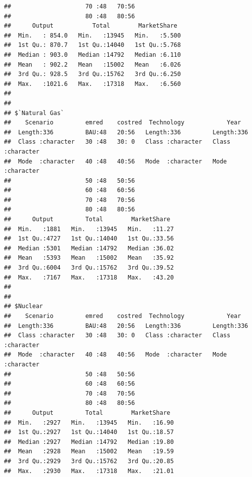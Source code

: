 \documentclass[]{article}
\begin{document}
\begin{verbatim}
##                     70 :48   70:56                                        
##                     80 :48   80:56                                        
##      Output           Total        MarketShare   
##  Min.   : 854.0   Min.   :13945   Min.   :5.500  
##  1st Qu.: 870.7   1st Qu.:14040   1st Qu.:5.768  
##  Median : 903.0   Median :14792   Median :6.110  
##  Mean   : 902.2   Mean   :15002   Mean   :6.026  
##  3rd Qu.: 928.5   3rd Qu.:15762   3rd Qu.:6.250  
##  Max.   :1021.6   Max.   :17318   Max.   :6.560  
##                                                  
## 
## $`Natural Gas`
##    Scenario         emred    costred  Technology            Year          
##  Length:336         BAU:48   20:56   Length:336         Length:336        
##  Class :character   30 :48   30: 0   Class :character   Class :character  
##  Mode  :character   40 :48   40:56   Mode  :character   Mode  :character  
##                     50 :48   50:56                                        
##                     60 :48   60:56                                        
##                     70 :48   70:56                                        
##                     80 :48   80:56                                        
##      Output         Total        MarketShare   
##  Min.   :1881   Min.   :13945   Min.   :11.27  
##  1st Qu.:4727   1st Qu.:14040   1st Qu.:33.56  
##  Median :5301   Median :14792   Median :36.02  
##  Mean   :5393   Mean   :15002   Mean   :35.92  
##  3rd Qu.:6004   3rd Qu.:15762   3rd Qu.:39.52  
##  Max.   :7167   Max.   :17318   Max.   :43.20  
##                                                
## 
## $Nuclear
##    Scenario         emred    costred  Technology            Year          
##  Length:336         BAU:48   20:56   Length:336         Length:336        
##  Class :character   30 :48   30: 0   Class :character   Class :character  
##  Mode  :character   40 :48   40:56   Mode  :character   Mode  :character  
##                     50 :48   50:56                                        
##                     60 :48   60:56                                        
##                     70 :48   70:56                                        
##                     80 :48   80:56                                        
##      Output         Total        MarketShare   
##  Min.   :2927   Min.   :13945   Min.   :16.90  
##  1st Qu.:2927   1st Qu.:14040   1st Qu.:18.57  
##  Median :2927   Median :14792   Median :19.80  
##  Mean   :2928   Mean   :15002   Mean   :19.59  
##  3rd Qu.:2929   3rd Qu.:15762   3rd Qu.:20.85  
##  Max.   :2930   Max.   :17318   Max.   :21.01  

\end{verbatim}
\end{document}
